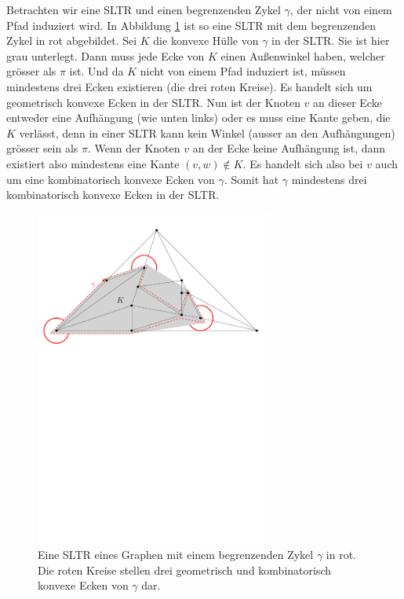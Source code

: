\begin{example}
Betrachten wir eine SLTR und einen begrenzenden Zykel $\gamma$, der nicht von einem Pfad induziert wird. In Abbildung \ref{pic_exp_cycle} ist so eine SLTR mit dem begrenzenden Zykel in rot abgebildet. Sei $K$ die konvexe Hülle von $\gamma$ in der SLTR. Sie ist hier grau unterlegt. Dann muss jede Ecke von $K$ einen Außenwinkel haben, welcher grösser als $\pi$ ist. Und da $K$ nicht von einem Pfad induziert ist, müssen mindestens drei Ecken existieren (die drei roten Kreise). Es handelt sich um geometrisch konvexe Ecken in der SLTR. Nun ist der Knoten $v$ an dieser Ecke entweder eine Aufhängung (wie unten links) oder es muss eine Kante geben, die $K$ verlässt, denn in einer SLTR kann kein Winkel (ausser an den Aufhängungen) grösser sein als $\pi$. Wenn der Knoten $v$ an der Ecke keine Aufhängung ist, dann existiert also mindestens eine Kante $(v,w) \notin K$. Es handelt sich also bei $v$ auch um eine kombinatorisch konvexe Ecken von $\gamma$. Somit hat $\gamma$ mindestens drei kombinatorisch konvexe Ecken in der SLTR. 
\end{example}

\begin{figure}[h]
	\centering
  \includegraphics[width=0.7\textwidth]{exp_cycle.pdf}
  \caption{Eine SLTR eines Graphen mit einem begrenzenden Zykel $\gamma$ in rot. Die roten Kreise stellen drei geometrisch und kombinatorisch konvexe Ecken von $\gamma$ dar.}
  \label{pic_exp_cycle}
\end{figure}

